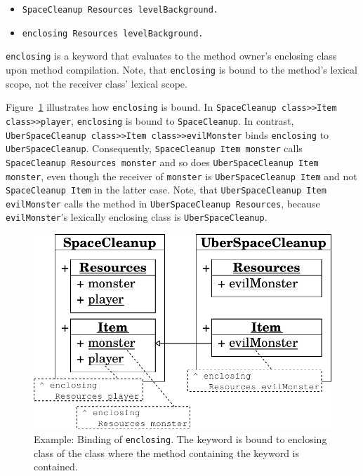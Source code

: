 \begin{itemize}
	\item \texttt{SpaceCleanup Resources levelBackground.}
	\item \texttt{enclosing Resources levelBackground.}
\end{itemize}

\texttt{enclosing} is a keyword that evaluates to the method owner's enclosing class upon method compilation. Note, that \texttt{enclosing} is bound to the method's lexical scope, not the receiver class' lexical scope.

Figure~\ref{fig:concept_lexical_thisouter} illustrates how \texttt{enclosing} is bound. In \texttt{SpaceCleanup class>>Item class>>player}, \texttt{enclosing} is bound to \texttt{SpaceCleanup}. In contrast, \texttt{UberSpaceClean\-up class>>Item class>>evilMonster} binds \texttt{enclosing} to \texttt{UberSpaceCleanup}. Consequently, \texttt{SpaceCleanup Item monster} calls \texttt{SpaceCleanup Resources monster} and so does \texttt{UberSpaceCleanup Item monster}, even though the receiver of \texttt{monster} is \texttt{UberSpaceCleanup Item} and not \texttt{SpaceCleanup Item} in the latter case. Note, that \texttt{UberSpaceCleanup Item evilMonster} calls the method in \texttt{UberSpaceCleanup Resources}, because \texttt{evilMonster}'s lexically enclosing class is \texttt{UberSpaceCleanup}.

\begin{figure}[!htp]
	\includegraphics[scale=0.75]{nested_lexical1.pdf}
	\centering
	\caption[Example: Binding of \texttt{enclosing}]{Example: Binding of \texttt{enclosing}. The keyword is bound to enclosing class of the class where the method containing the keyword is contained.}
	\label{fig:concept_lexical_thisouter}
\end{figure}

